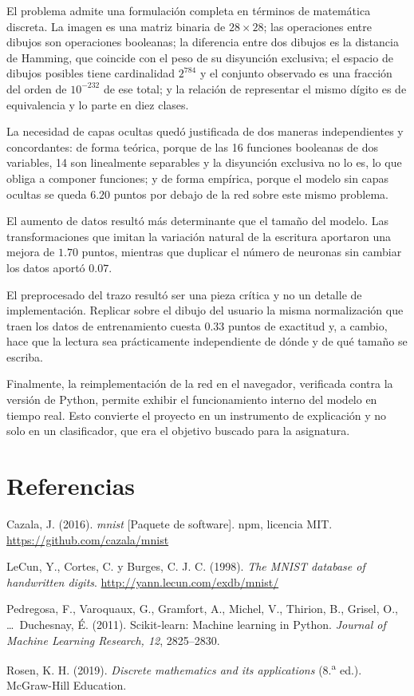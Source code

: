 \documentclass[12pt,letterpaper]{article}
\begin{document}
El problema admite una formulación completa en términos de matemática discreta. La
imagen es una matriz binaria de $28\times28$; las operaciones entre dibujos son
operaciones booleanas; la diferencia entre dos dibujos es la distancia de Hamming,
que coincide con el peso de su disyunción exclusiva; el espacio de dibujos posibles
tiene cardinalidad $2^{784}$ y el conjunto observado es una fracción del orden de
$10^{-232}$ de ese total; y la relación de representar el mismo dígito es de
equivalencia y lo parte en diez clases.

La necesidad de capas ocultas quedó justificada de dos maneras independientes y
concordantes: de forma teórica, porque de las 16 funciones booleanas de dos variables,
14 son linealmente separables y la disyunción exclusiva no lo es, lo que obliga a
componer funciones; y de forma empírica, porque el modelo sin capas ocultas se queda
$6.20$ puntos por debajo de la red sobre este mismo problema.

El aumento de datos resultó más determinante que el tamaño del modelo. Las
transformaciones que imitan la variación natural de la escritura aportaron una mejora
de $1.70$ puntos, mientras que duplicar el número de neuronas sin cambiar los datos
aportó $0.07$.

El preprocesado del trazo resultó ser una pieza crítica y no un detalle de
implementación. Replicar sobre el dibujo del usuario la misma normalización que traen
los datos de entrenamiento cuesta $0.33$ puntos de exactitud y, a cambio, hace que la
lectura sea prácticamente independiente de dónde y de qué tamaño se escriba.

Finalmente, la reimplementación de la red en el navegador, verificada contra la
versión de Python, permite exhibir el funcionamiento interno del modelo en tiempo
real. Esto convierte el proyecto en un instrumento de explicación y no solo en un
clasificador, que era el objetivo buscado para la asignatura.

\section{Referencias}

\begin{description}[leftmargin=1.5em,style=unboxed,itemsep=5pt,labelsep=0pt,font=\normalfont]
\item Cazala, J. (2016). \textit{mnist} [Paquete de software]. npm, licencia MIT.
  \url{https://github.com/cazala/mnist}
\item LeCun, Y., Cortes, C. y Burges, C. J. C. (1998). \textit{The MNIST database of
  handwritten digits}. \url{http://yann.lecun.com/exdb/mnist/}
\item Pedregosa, F., Varoquaux, G., Gramfort, A., Michel, V., Thirion, B., Grisel, O.,
  \dots\ Duchesnay, É. (2011). Scikit-learn: Machine learning in Python.
  \textit{Journal of Machine Learning Research, 12}, 2825--2830.
\item Rosen, K. H. (2019). \textit{Discrete mathematics and its applications}
  (8.\textsuperscript{a} ed.). McGraw-Hill Education.
\end{description}
\end{document}
